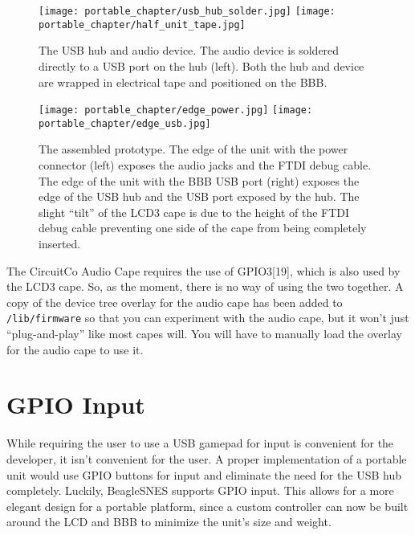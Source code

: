 \begin{figure}[h]
\centering\texttt{[image: portable\_chapter/usb\_hub\_solder.jpg]} 
\texttt{[image: portable\_chapter/half\_unit\_tape.jpg]} 
\caption{The USB hub and audio device. The audio device is soldered directly to a USB port on the hub (left).  Both the hub and device are wrapped in electrical tape and positioned on the BBB.}\label{fig:usb_hub}
\end{figure}

\begin{figure}[h]
\centering\texttt{[image: portable\_chapter/edge\_power.jpg]} 
\texttt{[image: portable\_chapter/edge\_usb.jpg]} 
\caption{The assembled prototype. The edge of the unit with the power connector (left) exposes the audio jacks and the FTDI debug cable.  The edge of the unit with the BBB USB port (right) exposes the edge of the USB hub and the USB port exposed by the hub. The slight ``tilt'' of the LCD3 cape is due to the height of the FTDI debug cable preventing one side of the cape from being completely inserted.}\label{fig:end_images}
\end{figure}

\begin{updateWarn}
The CircuitCo Audio Cape requires the use of GPIO3[19], which is also used by the LCD3 cape.  So, as the moment, there is no way of using the two together.  A copy of the device tree overlay for the audio cape has been added to \texttt{/lib/firmware} so that you can experiment with the audio cape, but it won't just ``plug-and-play'' like most capes will.  You will have to manually load the overlay for the audio cape to use it.
\end{updateWarn}

\section{GPIO Input}\label{sec:gpio_hardware}

While requiring the user to use a USB gamepad for input is convenient for the developer, it isn't convenient for the user.  A proper implementation of a portable unit would use GPIO buttons for input and eliminate the need for the USB hub completely.  Luckily, BeagleSNES supports GPIO input.  This allows for a more elegant design for a portable platform, since a custom controller can now be built around the LCD and BBB to minimize the unit's size and weight.


